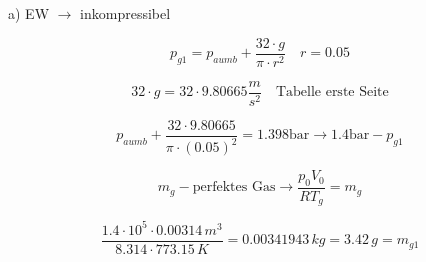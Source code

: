 a) EW $\rightarrow$ inkompressibel

\[
p_{g1} = p_{aumb} + \frac{32 \cdot g}{\pi \cdot r^2} \quad r = 0.05
\]

\[
32 \cdot g = 32 \cdot 9.80665 \frac{m}{s^2} \quad \text{Tabelle erste Seite}
\]

\[
p_{aumb} + \frac{32 \cdot 9.80665}{\pi \cdot (0.05)^2} = 1.398 \text{bar} \rightarrow 1.4 \text{bar} - p_{g1}
\]

\[
m_g - \text{perfektes Gas} \rightarrow \frac{p_0 V_0}{R T_g} = m_g
\]

\[
\frac{1.4 \cdot 10^5 \cdot 0.00314 \, m^3}{8.314 \cdot 773.15 \, K} = 0.00341943 \, kg = \boxed{3.42 \, g = m_{g1}}
\]
